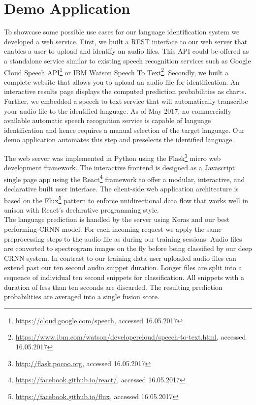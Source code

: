 \section{Demo Application}
\label{sec:demo}
To showcase some possible use cases for our language identification system we developed a web service. First, we built a REST interface to our web server that enables a user to upload and identify an audio files. This API could be offered as a standalone service similar to existing speech recognition services such as Google Cloud Speech API\footnote{\url{https://cloud.google.com/speech}, accessed 16.05.2017} or IBM Watson Speech To Text\footnote{\url{https://www.ibm.com/watson/developercloud/speech-to-text.html}, accessed 16.05.2017}. Secondly, we built a complete website that allows you to upload an audio file for identification. An interactive results page displays the computed prediction probabilities as charts. Further, we embedded a speech to text service that will automatically transcribe your audio file to the identified language. As of May 2017, no commercially available automatic speech recognition service is capable of language identification and hence requires a manual selection of the target language. Our demo application automates this step and preselects the identified language.

The web server was implemented in Python using the Flask\footnote{\url{http://flask.pocoo.org}, accessed 16.05.2017} micro web development framework. The interactive frontend is designed as a Javascript single page app using the React\footnote{\url{https://facebook.github.io/react/}, accessed 16.05.2017} framework to offer a modular, interactive, and declarative built user interface. The client-side web application architecture is based on the Flux\footnote{\url{https://facebook.github.io/flux}, accessed 16.05.2017} pattern to enforce unidirectional data flow that works well in unison with React's declarative programming style.\\
The language prediction is handled by the server using Keras and our best performing CRNN model. For each incoming request we apply the same preprocessing steps to the audio file as during our training sessions. Audio files are converted to spectrogram images on the fly before being classified by our deep CRNN system. In contrast to our training data user uploaded audio files can extend past our ten second audio snippet duration. Longer files are split into a sequence of individual ten second snippets for classification. All snippets with a duration of less than ten seconds are discarded. The resulting prediction probabilities are averaged into a single fusion score. 






